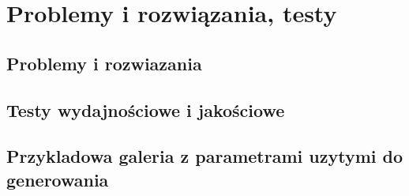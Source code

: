 

\chapter{Problemy i rozwiązania, testy}

\section{Problemy i rozwiazania}

\section{Testy wydajnościowe i jakościowe}

\section{Przykladowa galeria z parametrami uzytymi do generowania}